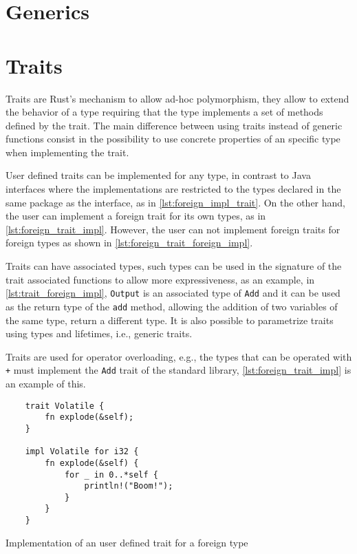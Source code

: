 \section{Generics}

\section{Traits}
Traits are Rust's mechanism to allow ad-hoc polymorphism, they allow to extend the behavior of a type requiring that the type implements a set of methods defined by the trait. The main difference between using traits instead of generic functions consist in the possibility to use concrete properties of an specific type when implementing the trait.

User defined traits can be implemented for any type, in contrast to Java interfaces where the implementations are restricted to the types declared in the same package as the interface, as in \ref{lst:foreign_impl_trait}. On the other hand, the user can implement a foreign trait for its own types, as in \ref{lst:foreign_trait_impl}. However, the user can not implement foreign traits for foreign types as shown in \ref{lst:foreign_trait_foreign_impl}.

Traits can have associated types, such types can be used in the signature of the trait associated functions to allow more expressiveness, as an example, in \ref{lst:trait_foreign_impl}, \texttt{Output} is an associated type of \texttt{Add} and it can be used as the return type of the \texttt{add} method, allowing the addition of two variables of the same type, return a different type. It is also possible to parametrize traits using types and lifetimes, i.e., generic traits.

Traits are used for operator overloading, e.g., the types that can be operated with \texttt{+} must implement the \texttt{Add} trait of the standard library, \ref{lst:foreign_trait_impl} is an example of this. 

\begin{listing}
	\begin{verbatim}
    trait Volatile {
        fn explode(&self);
    }

    impl Volatile for i32 {
        fn explode(&self) {
            for _ in 0..*self {
                println!("Boom!");
            }
        }
    }
    \end{verbatim}
  \caption{Implementation of an user defined trait for a foreign type}
  \label{lst:trait_foreign_impl}
\end{listing}


